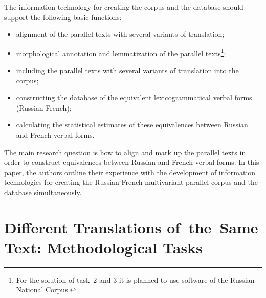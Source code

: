 \begin{multicols}{2}
   The information technology for creating the corpus and the database should support the 
following basic functions:
   \begin{itemize}
\item alignment of the parallel texts with several variants of translation;
\item morphological annotation and lemmatization of the parallel texts\footnote[5]{For the 
solution of task~2 and 3 it is planned to use software of the Russian National Corpus.};
\item including the parallel texts with several variants of translation into the corpus;
\item constructing the database of the equivalent lexicogrammatical verbal forms 
(Russian-French);
\item calculating the statistical estimates of these equivalences between Russian and French 
verbal forms.
\end{itemize}

   The main research question is how to align and mark up the parallel texts in order to construct 
equivalences between Russian and French verbal forms. In this paper, the authors outline their experience 
with the development of information technologies for creating the Russian-French multivariant 
parallel corpus and the database simultaneously.

\section{Different Translations of~the~Same Text: Methodological Tasks}


\end{multicols}
